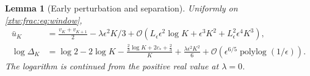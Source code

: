 \documentclass[11pt]{article}
\newtheorem{lemma}[theorem]{Lemma}
\theoremstyle{remark}\newtheorem{remark}[theorem]{Remark}
\newcommand{\OO}{\mathcal O}
\begin{document}
\begin{lemma}[Early perturbation and separation]\label{xtw:frac:lem:early}
Uniformly on \eqref{xtw:frac:eq:window},
\begin{align}
 \bar u_K&=\frac{v_K+v_{K+1}}2-\lambda\epsilon^2K/3
       +\OO(L_\epsilon\epsilon^2\log K+\epsilon^3K^2
                         +L_\epsilon^2\epsilon^4K^3),\label{xtw:frac:eq:earlyu}\\
 \log\Delta_K&=\log2-2\log K
       -\frac{\frac23\log K+2c_*+\frac23}{K}
       +\frac{\lambda\epsilon^2K^2}{6}
       +\OO(\epsilon^{6/5}\operatorname{polylog}(1/\epsilon)).
                                                        \label{xtw:frac:eq:earlyD}
\end{align}
The logarithm is continued from the positive real value at $\lambda=0$.
\end{lemma}
\end{document}
